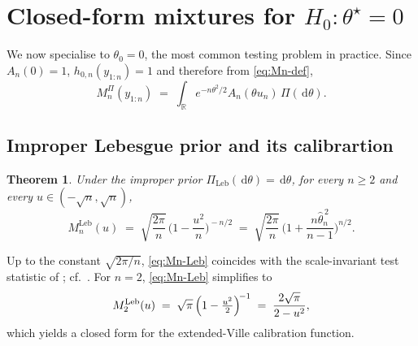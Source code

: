 \documentclass[numsec,webpdf,modern,medium,namedate]{oup-authoring-template}
\theoremstyle{thmstyleone}%
\newtheorem{theorem}{Theorem}%
\theoremstyle{thmstyletwo}%
\theoremstyle{thmstylethree}%
\newcommand{\dd}{\,\mathrm{d}}
\newcommand{\Leb}{\mathrm{Leb}}
\newcommand{\1}{\mathbf{1}}
\begin{document}
\section{Closed-form mixtures for \texorpdfstring{$H_0:\theta^\star=0$}{H0: theta*=0}}\label{sec:closedform}

We now specialise to \(\theta_0=0\), the most common testing problem
in practice. Since \(A_n(0)=1\),
\(h_{0,n}(y_{1:n})=1\) and therefore from \eqref{eq:Mn-def},
\begin{equation}\label{eq:Mn-zero}
   M_n^{\Pi}(y_{1:n})\;=\;\int_\mathbb{R} e^{-n\theta^2/2}A_n(\theta u_n)
                     \,\Pi(\dd\theta).
\end{equation}

\subsection{Improper Lebesgue prior and its calibrartion}\label{ssec:Leb}

\begin{theorem}\label{thm:Mn-Leb}
Under the improper prior \(\Pi_{\Leb}(\dd\theta)=\dd\theta\), for
every \(n\geq 2\) and every \(u\in(-\sqrt n,\sqrt n)\),
\begin{equation}\label{eq:Mn-Leb}
  M_n^{\Leb}(u)\;=\;\sqrt{\frac{2\pi}{n}}\,
  \biggl(1-\frac{u^2}{n}\biggr)^{\!-n/2}
  \;=\;\sqrt{\frac{2\pi}{n}}\,
  \biggl(1+\frac{n\widehat\theta_n^{\,2}}{n-1}\biggr)^{\!n/2}.
\end{equation}
\end{theorem}

Up to the constant \(\sqrt{2\pi/n}\), \eqref{eq:Mn-Leb} coincides with the scale-invariant test statistic of \cite[Theorem 2]{Lai1976}; cf.\ \cite[Theorem 4.1]{Wang2025}. For \(n=2\), \eqref{eq:Mn-Leb} simplifies to
\begin{equation}\label{eq:M2-Leb}
   M_2^{\Leb}(u)\;=\;\sqrt{\pi}\,\Bigl(1-\tfrac{u^2}{2}\Bigr)^{\!-1}
   \;=\;\frac{2\sqrt\pi}{2-u^2},
\end{equation}
which yields a closed form for the extended-Ville calibration function.



\end{document}
